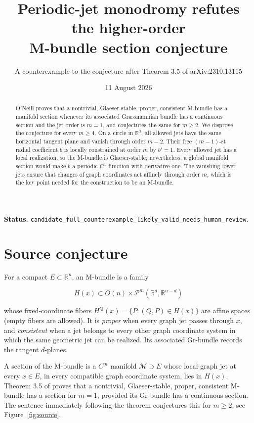 \documentclass[11pt]{article}
\title{Periodic-jet monodromy refutes the higher-order\\
M-bundle section conjecture}
\author{A counterexample to the conjecture after Theorem 3.5 of arXiv:2310.13115}
\date{11 August 2026}
\newcommand{\R}{\mathbb R}
\newcommand{\cM}{\mathcal M}
\newcommand{\cP}{\mathcal P}
\begin{document}
\maketitle

\noindent\textbf{Status.}
\texttt{candidate\_full\_counterexample\_likely\_valid\_needs\_human\_review}.

\begin{abstract}
O'Neill proves that a nontrivial, Glaeser-stable, proper, consistent
M-bundle has a manifold section whenever its associated Grassmannian bundle
has a continuous section and the jet order is \(m=1\), and conjectures the
same for \(m\ge2\). We disprove the conjecture for every \(m\ge4\). On a
circle in \(\R^3\), all allowed jets have the same horizontal tangent plane
and vanish through order \(m-2\). Their free \((m-1)\)-st radial coefficient
\(b\) is locally constrained at order \(m\) by \(b'=1\). Every allowed jet
has a local realization, so the M-bundle is Glaeser-stable; nevertheless, a
global manifold section would make \(b\) a periodic \(C^1\) function with
derivative one. The vanishing lower jets ensure that changes of graph
coordinates act affinely through order \(m\), which is the key point needed
for the construction to be an M-bundle.
\end{abstract}

\section{Source conjecture}

For a compact \(E\subset\R^n\), an M-bundle is a family

\[
 H(x)\subset O(n)\times\cP^m(\R^d,\R^{n-d})
\]

whose fixed-coordinate fibers \(H^Q(x)=\{P:(Q,P)\in H(x)\}\) are affine
spaces (empty fibers are allowed). It is \emph{proper} when every graph jet
passes through \(x\), and \emph{consistent} when a jet belongs to every
other graph coordinate system in which the same geometric jet can be
realized. Its associated Gr-bundle records the tangent \(d\)-planes.

A section of the M-bundle is a \(C^m\) manifold \(\cM\supset E\) whose local
graph jet at every \(x\in E\), in every compatible graph coordinate system,
lies in \(H(x)\). Theorem 3.5 of \cite{source} proves that a nontrivial,
Glaeser-stable, proper, consistent M-bundle has a section for \(m=1\),
provided its Gr-bundle has a continuous section. The sentence immediately
following the theorem conjectures this for \(m\ge2\); see
Figure~\ref{fig:source}.
\end{document}
